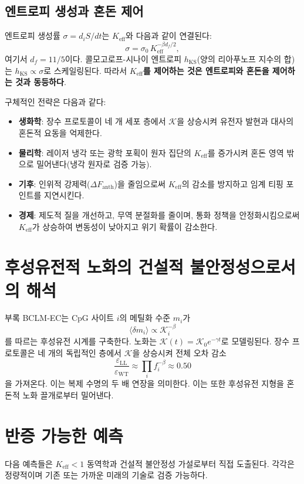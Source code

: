 \documentclass[12pt,a4paper]{article}
\newcommand{\Keff}{K_{\mathrm{eff}}}
\newcommand{\REL}{\mathcal{K}}
\begin{document}
	\subsection{엔트로피 생성과 혼돈 제어}
	
	엔트로피 생성률 \(\sigma = d_iS/dt\)는 \(\Keff\)와 다음과 같이 연결된다:
	\[
	\sigma = \sigma_0\, \Keff^{-\beta d_f/2},
	\]
	여기서 \(d_f = 11/5\)이다. 콜모고로프-시나이 엔트로피 \(h_{\mathrm{KS}}\)(양의 리아푸노프 지수의 합)는 \(h_{\mathrm{KS}} \propto \sigma\)로 스케일링된다. 따라서 \textbf{\(\Keff\)를 제어하는 것은 엔트로피와 혼돈을 제어하는 것과 동등하다}.
	
	구체적인 전략은 다음과 같다:
	\begin{itemize}
		\item \textbf{생화학}: 장수 프로토콜이 네 개 세포 층에서 \(\REL\)을 상승시켜 유전자 발현과 대사의 혼돈적 요동을 억제한다.
		\item \textbf{물리학}: 레이저 냉각 또는 광학 포획이 원자 집단의 \(\Keff\)를 증가시켜 혼돈 영역 밖으로 밀어낸다(냉각 원자로 검증 가능).
		\item \textbf{기후}: 인위적 강제력(\(\Delta F_{\mathrm{anth}}\))을 줄임으로써 \(\Keff\)의 감소를 방지하고 임계 티핑 포인트를 지연시킨다.
		\item \textbf{경제}: 제도적 질을 개선하고, 무역 분절화를 줄이며, 통화 정책을 안정화시킴으로써 \(\Keff\)가 상승하여 변동성이 낮아지고 위기 확률이 감소한다.
	\end{itemize}
	
	\section{후성유전적 노화의 건설적 불안정성으로서의 해석}
	
	부록 BCLM‑EC는 CpG 사이트 \(i\)의 메틸화 수준 \(m_i\)가
	\[
	\langle \delta m_i \rangle \propto \REL_i^{-\beta}
	\]
	를 따르는 후성유전 시계를 구축한다. 노화는 \(\REL(t) = \REL_0 e^{-\gamma t}\)로 모델링된다. 장수 프로토콜은 네 개의 독립적인 층에서 \(\REL\)을 상승시켜 전체 오차 감소
	\[
	\frac{\varepsilon_{\mathrm{LL}}}{\varepsilon_{\mathrm{WT}}} \approx \prod_i f_i^{-\beta}
	\approx 0.50
	\]
	을 가져온다. 이는 복제 수명의 두 배 연장을 의미한다. 이는 또한 후성유전 지형을 혼돈적 노화 끌개로부터 밀어낸다.
	
	\section{반증 가능한 예측}
	
	다음 예측들은 \(\Keff < 1\) 동역학과 건설적 불안정성 가설로부터 직접 도출된다. 각각은 정량적이며 기존 또는 가까운 미래의 기술로 검증 가능하다.
	
\end{document}
